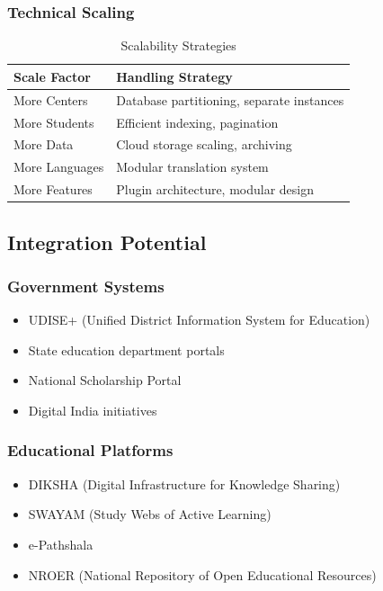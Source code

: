 \documentclass[12pt,a4paper]{article}
\begin{document}
\subsubsection{Technical Scaling}
\begin{table}[H]
\centering
\small
\begin{tabularx}{\textwidth}{|l|X|}
\hline
\rowcolor{lightgray}
\textbf{Scale Factor} & \textbf{Handling Strategy} \\
\hline
More Centers & Database partitioning, separate instances \\
\hline
More Students & Efficient indexing, pagination \\
\hline
More Data & Cloud storage scaling, archiving \\
\hline
More Languages & Modular translation system \\
\hline
More Features & Plugin architecture, modular design \\
\hline
\end{tabularx}
\caption{Scalability Strategies}
\end{table}

\subsection{Integration Potential}

\subsubsection{Government Systems}
\begin{itemize}[leftmargin=*, itemsep=0.2em]
    \item UDISE+ (Unified District Information System for Education)
    \item State education department portals
    \item National Scholarship Portal
    \item Digital India initiatives
\end{itemize}

\subsubsection{Educational Platforms}
\begin{itemize}[leftmargin=*, itemsep=0.2em]
    \item DIKSHA (Digital Infrastructure for Knowledge Sharing)
    \item SWAYAM (Study Webs of Active Learning)
    \item e-Pathshala
    \item NROER (National Repository of Open Educational Resources)
\end{itemize}
\end{document}
